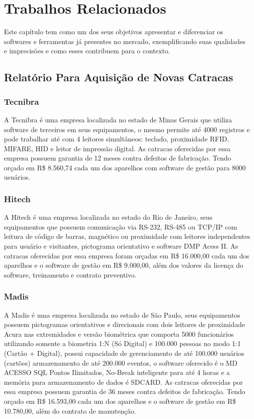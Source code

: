 \section{Trabalhos Relacionados}
Este capítulo tem como um dos seus objetivos apresentar e diferenciar os softwares e ferramentas já presentes no mercado, exemplificando suas qualidades e imprecisões e como esses contribuem para o contexto.

\subsection{Relatório Para Aquisição de Novas Catracas}
\subsubsection{Tecnibra}
A Tecnibra é uma empresa localizada no estado de Minas Gerais que utiliza software de terceiros em seus equipamentos, o mesmo permite até 4000 registros e pode trabalhar até com 4 leitores simultâneos: teclado, proximidade RFID, MIFARE, HID e leitor de impressão digital. As catracas oferecidas por essa empresa possuem garantia de 12 meses contra defeitos de fabricação. Tendo orçado em R\$ 8.560,74 cada um dos aparelhos com software de gestão para 8000 usuários.
\subsubsection{Hitech}
A Hitech é uma empresa localizada no estado do Rio de Janeiro, seus equipamentos que possuem
comunicação via RS-232, RS-485 ou TCP/IP com leitura de código de barras,
magnético ou proximidade com leitores independentes para usuário e visitantes,
pictograma orientativo e software DMP Acess II. As catracas oferecidas por essa empresa foram orçadas em R\$ 16.000,00 cada um dos aparelhos e o software de gestão em R\$ 9.000,00, além dos valores da licença do software, treinamento e contrato preventivo.
\subsubsection{Madis}
A Madis é uma empresa localizada no estado de São Paulo, seus equipamentos possuem pictogramas orientativos e direcionais com dois leitores de
proximidade Acura nas extremidades e versão biométrica que comporta 5000
funcionários utilizando somente a biometria 1:N (Só Digital) e 100.000 pessoas no
modo 1:1 (Cartão + Digital), possui capacidade de gerenciamento de até 100.000
usuários (cartões) armazenamento de até 200.000 eventos, o software oferecido é o
MD ACESSO SQL Pontos Ilimitados, No-Break inteligente para até 4 horas e a
memória para armazenamento de dados é SDCARD. As catracas oferecidas por essa empresa possuem garantia de 36 meses contra defeitos de fabricação. Tendo orçado em R\$ 16.593,00 cada um dos aparelhos e o software de gestão em R\$ 10.780,00, além do contrato de manutenção.

